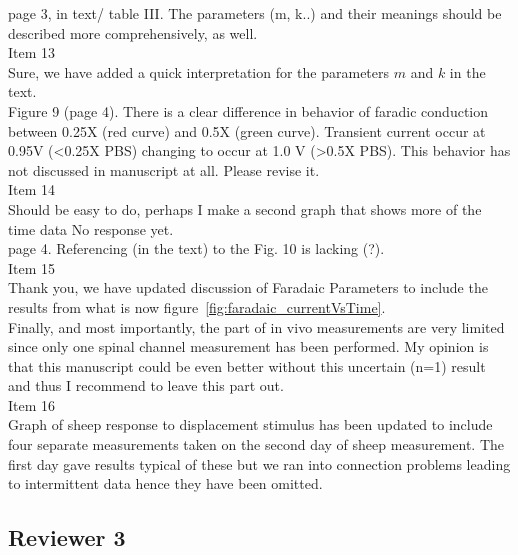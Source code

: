 \documentclass[journal, a4paper]{IEEEtran}
\begin{document}
{page 3, in text/ table III. The parameters (m, k..) and their meanings should be described more comprehensively, as well.\\
{\color{OliveGreen} 
    Item 13\\
    Sure, we have added a quick interpretation for the parameters $m$ and $k$ in the text.
}\\

Figure 9 (page 4). There is a clear difference in behavior of faradic conduction between 0.25X (red curve) and 0.5X (green curve). Transient current occur at 0.95V (<0.25X PBS) changing to occur at 1.0 V (>0.5X PBS). This behavior has not discussed in manuscript at all. Please revise it.\\
{\color{OliveGreen}
    Item 14\\
    {\color{Red} Should be easy to do, perhaps I make a second graph that shows more of the time data}
    No response yet.
}\\

page 4. Referencing (in the text) to the Fig. 10 is lacking (?).\\
{\color{OliveGreen}
    Item 15\\
    Thank you, we have updated discussion of Faradaic Parameters to include the results from what is now figure~\ref{fig:faradaic_currentVsTime}.
}\\

Finally, and most importantly, the part of in vivo measurements are very limited since only one spinal channel measurement has been performed. My opinion is that this manuscript could be even better without this uncertain (n=1) result and thus I recommend to leave this part out.\\
{\color{OliveGreen}
    Item 16\\ 
    Graph of sheep response to displacement stimulus has been updated to include four separate measurements taken on the second day of sheep measurement. The first day gave results typical of these but we ran into connection problems leading to intermittent data hence they have been omitted.
}\\
}

\subsection*{Reviewer 3}
\end{document}
